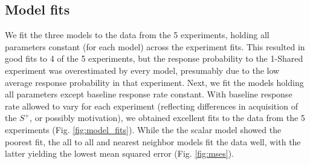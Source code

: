 \subsection*{Model fits}
We fit the three models to the data from the 5 experiments, holding all parameters constant (for each model) across the experiment fits.  
This resulted in good fits to 4 of the 5 experiments, but the response probability to the 1-Shared experiment was overestimated by every model, presumably due to the low average response probability in that experiment.  
Next, we fit the models holding all parameters except baseline response rate constant.  
With baseline response rate allowed to vary for each experiment (reflecting differences in acquisition of the $S^+$, or possibly motivation), we obtained excellent fits to the data from the 5 experiments (Fig. \ref{fig:model_fits}).  
While the the scalar model showed the poorest fit, the all to all and nearest neighbor models fit the data well, with the latter yielding the lowest mean squared error (Fig. \ref{fig:mses}).  